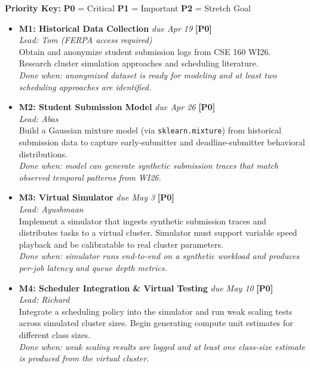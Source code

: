 \documentclass{article}
\begin{document}
{\small

\noindent\textbf{Priority Key:} \textbf{P0} = Critical \quad \textbf{P1} = Important \quad \textbf{P2} = Stretch Goal

\vspace{1em}

\begin{itemize}[leftmargin=0pt, itemindent=0pt, labelsep=0pt, label={}]
\item \textbf{M1: Historical Data Collection} \hfill \textit{due Apr 19} \textbf{[P0]}\\
\textit{Lead: Tom (FERPA access required)} \\
Obtain and anonymize student submission logs from CSE 160 WI26. Research cluster simulation approaches and scheduling literature.\\
\textit{Done when: anonymized dataset is ready for modeling and at least two scheduling approaches are identified.}

\item \textbf{M2: Student Submission Model} \hfill \textit{due Apr 26} \textbf{[P0]}\\
\textit{Lead: Abas} \\
Build a Gaussian mixture model (via \texttt{sklearn.mixture}) from historical submission data to capture early-submitter and deadline-submitter behavioral distributions.\\
\textit{Done when: model can generate synthetic submission traces that match observed temporal patterns from WI26.}

\item \textbf{M3: Virtual Simulator} \hfill \textit{due May 3} \textbf{[P0]}\\
\textit{Lead: Ayushmaan} \\
Implement a simulator that ingests synthetic submission traces and distributes tasks to a virtual cluster. Simulator must support variable speed playback and be calibratable to real cluster parameters.\\
\textit{Done when: simulator runs end-to-end on a synthetic workload and produces per-job latency and queue depth metrics.}

\item \textbf{M4: Scheduler Integration \& Virtual Testing} \hfill \textit{due May 10} \textbf{[P0]}\\
\textit{Lead: Richard} \\
Integrate a scheduling policy into the simulator and run weak scaling tests across simulated cluster sizes. Begin generating compute unit estimates for different class sizes.\\
\textit{Done when: weak scaling results are logged and at least one class-size estimate is produced from the virtual cluster.}


\end{itemize}}
\end{document}
